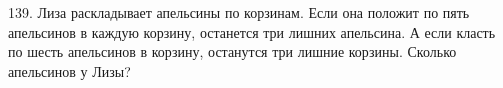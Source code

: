139. Лиза раскладывает апельсины по корзинам. Если она положит по пять апельсинов в каждую корзину, останется три лишних апельсина. А если класть по шесть апельсинов в корзину, останутся три лишние корзины. Сколько апельсинов у Лизы?\\
